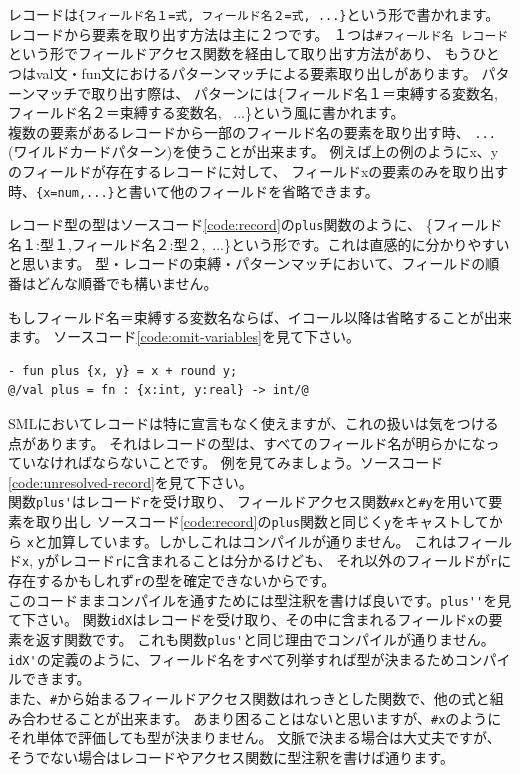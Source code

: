 \documentclass[11pt,a4paper]{article}
\begin{document}
レコードは\lstinline|{フィールド名１=式, フィールド名２=式, ...}|という形で書かれます。
レコードから要素を取り出す方法は主に２つです。
１つは\lstinline{#フィールド名 レコード}という形でフィールドアクセス関数を経由して取り出す方法があり、
もうひとつはval文・fun文におけるパターンマッチによる要素取り出しがあります。
パターンマッチで取り出す際は、
パターンには\{フィールド名１＝束縛する変数名, フィールド名２＝束縛する変数名, \ ...\}という風に書かれます。\\
複数の要素があるレコードから一部のフィールド名の要素を取り出す時、
\lstinline{...}(ワイルドカードパターン)を使うことが出来ます。
例えば上の例のようにx、yのフィールドが存在するレコードに対して、
フィールドxの要素のみを取り出す時、\lstinline|{x=num,...}|と書いて他のフィールドを省略できます。

レコード型の型はソースコード\ref{code:record}の\lstinline{plus}関数のように、
\{フィールド名１:型１,フィールド名２:型２,\ ...\}という形です。これは直感的に分かりやすいと思います。
型・レコードの束縛・パターンマッチにおいて、フィールドの順番はどんな順番でも構いません。

もしフィールド名＝束縛する変数名ならば、イコール以降は省略することが出来ます。
ソースコード\ref{code:omit-variables}を見て下さい。

\begin{lstlisting}[caption=レコードのパターンマッチ時の変数名の省略,label=code:omit-variables]
- fun plus {x, y} = x + round y;
@/val plus = fn : {x:int, y:real} -> int/@
\end{lstlisting}

SMLにおいてレコードは特に宣言もなく使えますが、これの扱いは気をつける点があります。
それはレコードの型は、すべてのフィールド名が明らかになっていなければならないことです。
例を見てみましょう。ソースコード\ref{code:unresolved-record}を見て下さい。\\
関数\lstinline{plus'}はレコード\lstinline{r}を受け取り、
フィールドアクセス関数\lstinline{#x}と\lstinline{#y}を用いて要素を取り出し
ソースコード\ref{code:record}の\lstinline{plus}関数と同じく\lstinline{y}をキャストしてから
\lstinline{x}と加算しています。しかしこれはコンパイルが通りません。
これはフィールド\lstinline{x}, \lstinline{y}がレコード\lstinline{r}に含まれることは分かるけども、
それ以外のフィールドが\lstinline{r}に存在するかもしれず\lstinline{r}の型を確定できないからです。\\
このコードままコンパイルを通すためには型注釈を書けば良いです。\lstinline{plus''}を見て下さい。
関数\lstinline{idX}はレコードを受け取り、その中に含まれるフィールド\lstinline{x}の要素を返す関数です。
これも関数\lstinline{plus'}と同じ理由でコンパイルが通りません。
\lstinline{idX'}の定義のように、フィールド名をすべて列挙すれば型が決まるためコンパイルできます。\\
また、\lstinline{#}から始まるフィールドアクセス関数はれっきとした関数で、他の式と組み合わせることが出来ます。
あまり困ることはないと思いますが、\lstinline{#x}のようにそれ単体で評価しても型が決まりません。
文脈で決まる場合は大丈夫ですが、そうでない場合はレコードやアクセス関数に型注釈を書けば通ります。
\end{document}
